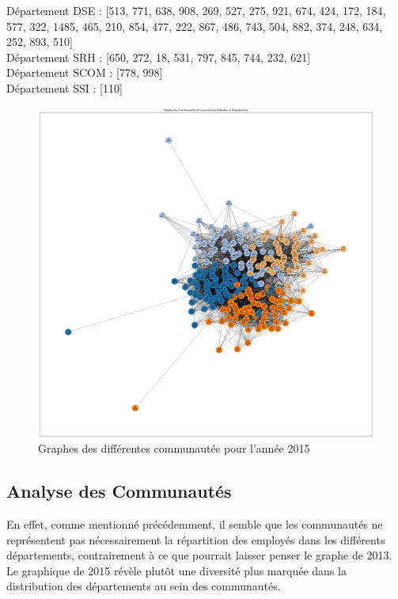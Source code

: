 \documentclass{article}
\begin{document}
Département DSE : [513, 771, 638, 908, 269, 527, 275, 921, 674, 424, 172, 184, 577, 322, 1485, 465, 210, 854, 477, 222, 867, 486, 743, 504, 882, 374, 248, 634, 252, 893, 510] \\
Département SRH : [650, 272, 18, 531, 797, 845, 744, 232, 621] \\
Département SCOM : [778, 998] \\
Département SSI : [110] \\

\begin{figure}[h]
    \centering
    \includegraphics[width=16.4cm]{assets/communaute/communaute_2015.png}
    \caption{Graphes des différentes communautés pour l'année 2015}
    \label{fig:communaute_2015}
\end{figure}

\subsection{Analyse des Communautés}

En effet, comme mentionné précédemment, il semble que les communautés ne représentent pas nécessairement la répartition des employés dans les différents départements, contrairement à ce que pourrait laisser penser le graphe de 2013. Le graphique de 2015 révèle plutôt une diversité plus marquée dans la distribution des départements au sein des communautés.
\end{document}
